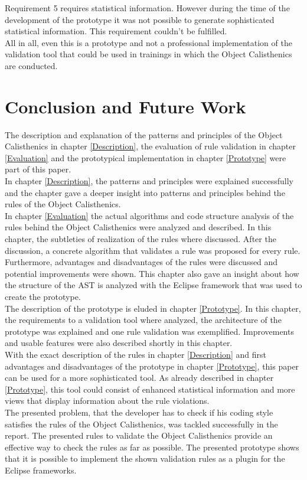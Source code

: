 Requirement 5 requires statistical information. However during the time of the development of the prototype it was not possible to generate sophisticated statistical information. This requirement couldn't be fulfilled. 
\\

All in all, even this is a prototype and not a professional implementation of the validation tool that could be used in trainings in which the Object Calisthenics are conducted. 

\chapter{Conclusion and Future Work}
\label{p:outlook}
The description and explanation of the patterns and principles of the Object Calisthenics in chapter \ref{Description}, the evaluation of rule validation in chapter \ref{Evaluation} and the prototypical implementation in chapter \ref{Prototype} were part of this paper. 
\\

In chapter \ref{Description}, the patterns and principles were explained successfully and the chapter gave a deeper insight into patterns and principles behind the rules of the Object Calisthenics. 
\\

In chapter \ref{Evaluation} the actual algorithms and code structure analysis of the rules behind the Object Calisthenics were analyzed and described. In this chapter, the subtleties of realization of the rules where discussed. After the discussion, a concrete algorithm that validates a rule was proposed for every rule. Furthermore, advantages and disadvantages of the rules were discussed and potential improvements were shown. 
This chapter also gave an insight about how the structure of the \ac{AST} is analyzed with the Eclipse framework that was used to create the prototype.
\\

The description of the prototype is eluded in chapter \ref{Prototype}. In this chapter, the requirements to a validation tool where analyzed, the architecture of the prototype was explained and one rule validation was exemplified. Improvements and usable features were also described shortly in this chapter. 
\\

With the exact description of the rules in chapter \ref{Description} and first advantages and disadvantages of the prototype in chapter \ref{Prototype}, this paper can be used for a more sophisticated tool. As already described in chapter \ref{Prototype}, this tool could consist of enhanced statistical information and more views that display information about the rule violations.
\\

The presented problem, that the developer has to check if his coding style satisfies the rules of the Object Calisthenics, was tackled successfully in the report. The presented rules to validate the Object Calisthenics provide an effective way to check the rules as far as possible. The presented prototype shows that it is possible to implement the shown validation rules as a plugin for the Eclipse frameworks.
